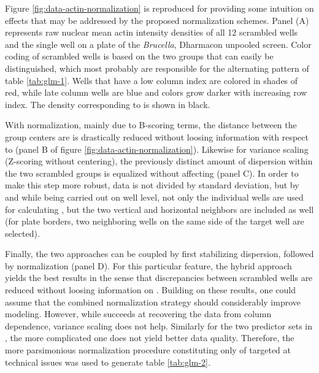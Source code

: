 

Figure \ref{fig:data-actin-normalization} is reproduced for providing some intuition on effects that may be addressed by the proposed normalization schemes. Panel (A) represents raw nuclear mean actin intensity densities of all 12 scrambled wells and the single  well on a plate of the \textit{Brucella}, Dharmacon unpooled screen. Color coding of scrambled wells is based on the two groups that can easily be distinguished, which most probably are responsible for the alternating pattern of table \ref{tab:glm-1}. Wells that have a low column index are colored in shades of red, while late column wells are blue and colors grow darker with increasing row index. The density corresponding to  is shown in black.

With  normalization, mainly due to B-scoring terms, the distance between the group centers are is drastically reduced without loosing information with respect to  (panel B of figure \ref{fig:data-actin-normalization}). Likewise for variance scaling (Z-scoring without centering), the previously distinct amount of dispersion within the two scrambled groups is equalized without affecting  (panel C). In order to make this step more robust, data is not divided by standard deviation, but by  and while being carried out on well level, not only the individual wells are used for calculating , but the two vertical and horizontal neighbors are included as well (for plate borders, two neighboring wells on the same side of the target well are selected).

Finally, the two approaches can be coupled by first stabilizing dispersion, followed by  normalization (panel D). For this particular feature, the hybrid approach yields the best results in the sense that discrepancies between scrambled wells are reduced without loosing information on . Building on these results, one could assume that the combined normalization strategy should considerably improve  modeling. However, while  succeeds at recovering the data from column dependence, variance scaling does not help. Similarly for the two predictor sets in , the more complicated one does not yield better data quality. Therefore, the more parsimonious normalization procedure constituting only of  targeted at technical issues was used to generate table \ref{tab:glm-2}.

